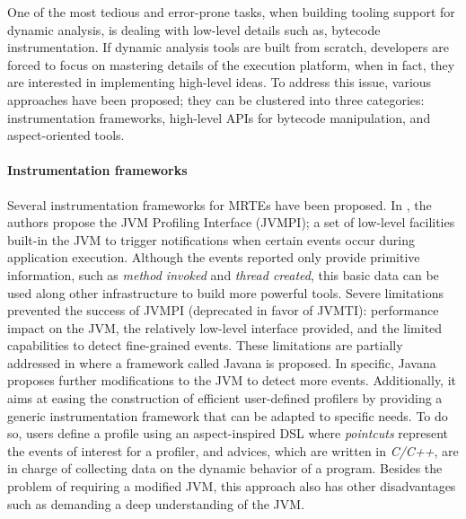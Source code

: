 One of the most tedious and error-prone tasks, when building tooling support for dynamic analysis, is dealing with low-level details such as, bytecode instrumentation.
If dynamic analysis tools are built from scratch, developers are forced to focus on mastering details of the execution platform, when in fact, they are interested in implementing high-level ideas.
To address this issue, various approaches have been proposed; they can be clustered into three categories: instrumentation frameworks, high-level APIs for bytecode manipulation, and aspect-oriented tools.

\paragraph{Instrumentation frameworks}
Several instrumentation frameworks for MRTEs have been proposed.
In \cite{Liang1999}, the authors propose the JVM Profiling Interface (JVMPI); a set of low-level facilities built-in the JVM to trigger notifications when certain events occur during application execution.
Although the events reported only provide primitive information, such as \textit{method invoked} and \textit{thread created}, this basic data can be used along other infrastructure to build more powerful tools.
Severe limitations prevented the success of JVMPI (deprecated in favor of JVMTI): performance impact on the JVM, the relatively low-level interface provided, and the limited capabilities to detect fine-grained events.
These limitations are partially addressed in \cite{Maebe06javana:a} where a framework called Javana is proposed.
In specific, Javana proposes further modifications to the JVM to detect more events.
Additionally, it aims at easing the construction of efficient user-defined profilers by providing a generic instrumentation framework that can be adapted to specific needs.
To do so, users define a profile using an aspect-inspired DSL where \textit{pointcuts} represent the events of interest for a profiler, and advices, which are written in \textit{C/C++}, are in charge of collecting data on the dynamic behavior of a program.
Besides the problem of requiring a modified JVM, this approach also has other disadvantages such as demanding a deep understanding of the JVM.

